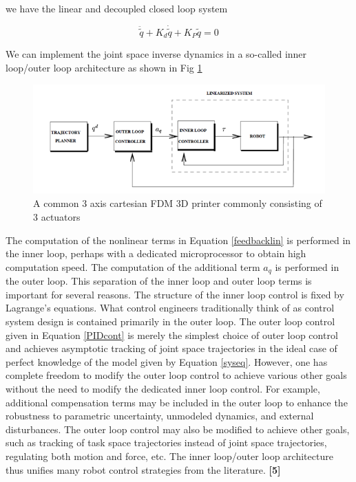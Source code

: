 \documentclass{UoNMCHA}
\numberwithin{equation}{section}
\begin{document}
	we have the linear and decoupled closed loop system
	
	\begin{equation}
	\ddot{\tilde{q}} + K_d \dot{\tilde{q}} + K_P \tilde{q} = 0
	\end{equation}
	
	We can implement the joint space inverse dynamics in a so-called inner loop/outer loop architecture as shown in Fig \ref{figs/Picture3}
	
	\begin{figure}[H]
		\begin{center}
			\includegraphics[width=.8\linewidth]{figs/Picture3}
			\caption{A  common 3 axis cartesian FDM 3D printer commonly consisting of 3 actuators}
			\label{figs/Picture3}
		\end{center}
	\end{figure}
	
	The computation of the nonlinear terms in Equation \ref{feedbacklin} is performed in the inner loop, perhaps with a dedicated microprocessor to obtain high computation speed. The computation of the additional term $a_q$ is performed in the outer loop. This separation of the inner loop and outer loop terms is important for several reasons. The structure of the inner loop control is fixed by Lagrange's equations. What control engineers traditionally think of as control system design is contained primarily in the outer loop. The outer loop control given in Equation \ref{PIDcont} is merely the simplest choice of outer loop control and achieves asymptotic tracking of joint space trajectories in the ideal case of perfect knowledge of the model given by Equation \ref{syseq}. However, one has complete freedom to modify the outer loop control to achieve various other goals without the need to modify the dedicated inner loop control. For example, additional compensation terms may be included in the outer loop to enhance the robustness to parametric uncertainty, unmodeled dynamics, and external disturbances. The outer loop control may also be modified to achieve other goals, such as tracking of task space trajectories instead of joint space trajectories, regulating both motion and force, etc. The inner loop/outer loop architecture thus unifies many robot control strategies from the literature. \textbf{[5]}
	
\end{document}
